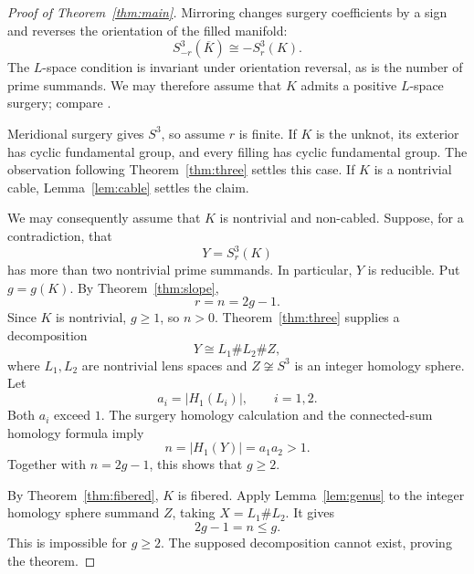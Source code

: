 \documentclass[11pt]{article}
\newcommand{\surg}[2]{S^3_{#1}(#2)}
\begin{document}
\begin{proof}[Proof of Theorem~\ref{thm:main}]
Mirroring changes surgery coefficients by a sign and reverses the
orientation of the filled manifold:
\[
    \surg{-r}{\overline K}\cong-\surg{r}{K}.
\]
The \(L\)-space condition is invariant under orientation reversal,
as is the number of prime summands. We may therefore assume that
\(K\) admits a positive \(L\)-space surgery; compare
\cite[Section~1]{HLZ}.

Meridional surgery gives \(S^3\), so assume \(r\) is finite.
If \(K\) is the unknot, its exterior has cyclic fundamental group,
and every filling has cyclic fundamental group. The observation
following Theorem~\ref{thm:three} settles this case.
If \(K\) is a nontrivial cable, Lemma~\ref{lem:cable} settles the
claim.

We may consequently assume that \(K\) is nontrivial and non-cabled.
Suppose, for a contradiction, that
\[
    Y=\surg{r}{K}
\]
has more than two nontrivial prime summands. In particular, \(Y\) is
reducible. Put \(g=g(K)\). By Theorem~\ref{thm:slope},
\[
    r=n=2g-1.
\]
Since \(K\) is nontrivial, \(g\geq 1\), so \(n>0\).
Theorem~\ref{thm:three} supplies a decomposition
\[
    Y\cong L_1\#L_2\# Z,
\]
where \(L_1,L_2\) are nontrivial lens spaces and \(Z\not\cong S^3\)
is an integer homology sphere. Let
\[
    a_i=|H_1(L_i)|,\qquad i=1,2.
\]
Both \(a_i\) exceed \(1\). The surgery homology calculation and the
connected-sum homology formula imply
\[
    n=|H_1(Y)|=a_1a_2>1.
\]
Together with \(n=2g-1\), this shows that \(g\geq 2\).

By Theorem~\ref{thm:fibered}, \(K\) is fibered.
Apply Lemma~\ref{lem:genus} to the integer homology sphere summand
\(Z\), taking \(X=L_1\#L_2\). It gives
\[
    2g-1=n\leq g.
\]
This is impossible for \(g\geq 2\). The supposed decomposition cannot
exist, proving the theorem.
\end{proof}
\end{document}
